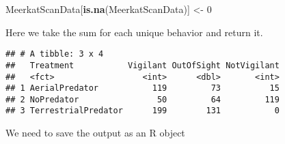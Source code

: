 \documentclass[]{book}
\newenvironment{Shaded}{\begin{snugshade}}{\end{snugshade}}
\newcommand{\DataTypeTok}[1]{\textcolor[rgb]{0.13,0.29,0.53}{#1}}
\newcommand{\DecValTok}[1]{\textcolor[rgb]{0.00,0.00,0.81}{#1}}
\newcommand{\KeywordTok}[1]{\textcolor[rgb]{0.13,0.29,0.53}{\textbf{#1}}}
\newcommand{\NormalTok}[1]{#1}
\newcommand{\OperatorTok}[1]{\textcolor[rgb]{0.81,0.36,0.00}{\textbf{#1}}}
\newcommand{\StringTok}[1]{\textcolor[rgb]{0.31,0.60,0.02}{#1}}
\begin{document}
\begin{Shaded}
\begin{Highlighting}[]
\NormalTok{MeerkatScanData[}\KeywordTok{is.na}\NormalTok{(MeerkatScanData)] <-}\StringTok{ }\DecValTok{0}
\end{Highlighting}
\end{Shaded}

Here we take the sum for each unique behavior and return it.

\begin{Shaded}
\end{Shaded}

\begin{verbatim}
## # A tibble: 3 x 4
##   Treatment           Vigilant OutOfSight NotVigilant
##   <fct>                  <int>      <dbl>       <int>
## 1 AerialPredator           119         73          15
## 2 NoPredator                50         64         119
## 3 TerrestrialPredator      199        131           0
\end{verbatim}

We need to save the output as an R object

\begin{Shaded}
\end{Shaded}
\end{document}
